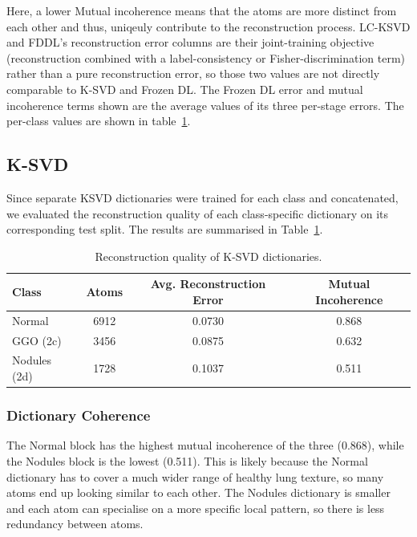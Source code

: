 Here, a lower Mutual incoherence means that the atoms are more distinct from each other and thus,
uniqeuly contribute to the reconstruction process.
LC-KSVD and FDDL's reconstruction error columns are their joint-training objective (reconstruction
combined with a label-consistency or Fisher-discrimination term) rather than a pure reconstruction
error, so those two values are not directly comparable to K-SVD and Frozen DL.
The Frozen DL error and mutual incoherence terms shown are the average values of its three per-stage errors.
The per-class values are shown in table~\ref{tab:ksvd-reconstruction}.

\subsection{K-SVD}

Since separate KSVD dictionaries were trained for each class and concatenated, we evaluated the reconstruction quality of each
class-specific dictionary on its corresponding test split. The results are summarised in Table~\ref{tab:ksvd-reconstruction}.

\begin{table}
\centering
\caption{Reconstruction quality of K-SVD dictionaries.}
\label{tab:ksvd-reconstruction}
\begin{tabular}{lccc}
\hline
\textbf{Class} & \textbf{Atoms} & \textbf{Avg. Reconstruction Error} & \textbf{Mutual Incoherence} \\
\hline
Normal                        & 6912 & 0.0730 & 0.868 \\
GGO (2c)                      & 3456 & 0.0875 & 0.632 \\
Nodules (2d)                  & 1728 & 0.1037 & 0.511 \\
\hline
\end{tabular}
\end{table}

\subsubsection{Dictionary Coherence}

The Normal block has the highest mutual incoherence of the three (0.868), while the Nodules block
is the lowest (0.511). This is likely because the Normal dictionary has to cover a much wider
range of healthy lung texture, so many atoms end up looking similar to each other. The Nodules
dictionary is smaller and each atom can specialise on a more specific local pattern, so there is
less redundancy between atoms.

